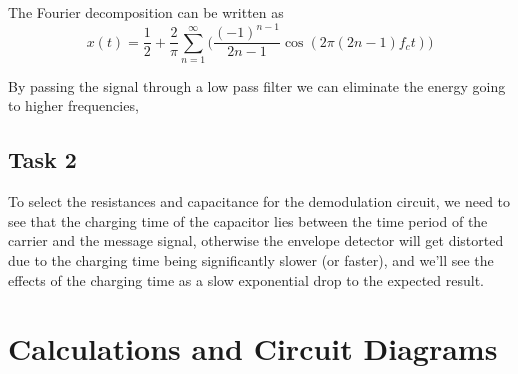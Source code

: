 \documentclass{article}
\begin{document}
The Fourier decomposition can be written as 
\begin{equation}
  x(t) = \frac{1}{2}+\frac{2}{\pi}\sum_{n=1}^\infty \Bigg(\frac{(-1)^{n-1}}{2n-1}\cos(2\pi(2n-1)f_c t)\Bigg)
\end{equation}

By passing the signal through a low pass filter we can eliminate the energy going to higher frequencies, 

\subsection{Task 2}
To select the resistances and capacitance for the demodulation circuit, we need to see that the charging time of the capacitor lies between the time period of the carrier and the message signal, otherwise the envelope detector will get distorted due to the charging time being significantly slower (or faster), and we'll see the effects of the charging time as a slow exponential drop to the expected result.
\section{Calculations and Circuit Diagrams}
\end{document}
